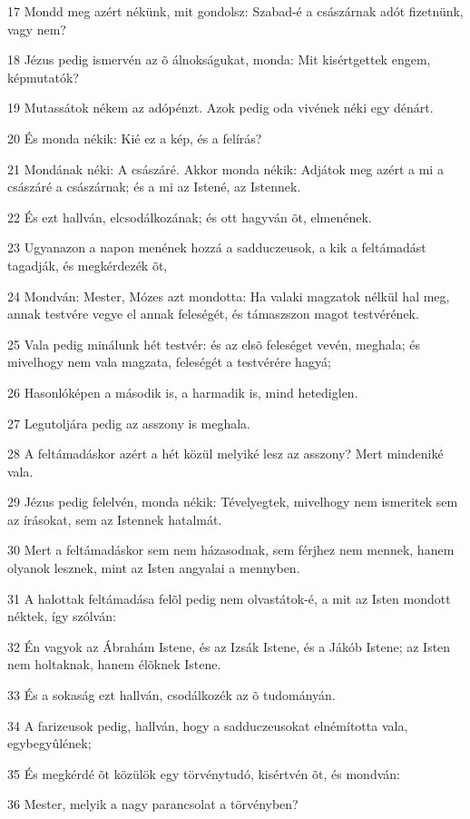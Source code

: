 \par 17 Mondd meg azért nékünk, mit gondolsz: Szabad-é a császárnak adót fizetnünk, vagy nem?
\par 18 Jézus pedig ismervén az õ álnokságukat, monda: Mit kisértgettek engem, képmutatók?
\par 19 Mutassátok nékem az adópénzt. Azok pedig oda vivének néki egy dénárt.
\par 20 És monda nékik: Kié ez a kép, és a felírás?
\par 21 Mondának néki: A császáré. Akkor monda nékik: Adjátok meg azért a mi a császáré a császárnak; és a mi az Istené, az Istennek.
\par 22 És ezt hallván, elcsodálkozának; és ott hagyván õt, elmenének.
\par 23 Ugyanazon a napon menének hozzá a sadduczeusok, a kik a feltámadást tagadják,  és megkérdezék õt,
\par 24 Mondván: Mester, Mózes azt mondotta: Ha valaki magzatok nélkül hal meg, annak testvére vegye el annak feleségét, és támaszszon magot testvérének.
\par 25 Vala pedig minálunk hét testvér: és az elsõ feleséget vevén, meghala; és mivelhogy nem vala magzata, feleségét a testvérére hagyá;
\par 26 Hasonlóképen a második is, a harmadik is, mind hetediglen.
\par 27 Legutoljára pedig az asszony is meghala.
\par 28 A feltámadáskor azért a hét közül melyiké lesz az asszony? Mert mindeniké vala.
\par 29 Jézus pedig felelvén, monda nékik: Tévelyegtek, mivelhogy nem ismeritek sem az írásokat, sem az Istennek hatalmát.
\par 30 Mert a feltámadáskor sem nem házasodnak, sem férjhez nem mennek, hanem olyanok lesznek, mint az Isten angyalai a mennyben.
\par 31 A halottak feltámadása felõl pedig nem olvastátok-é, a mit az Isten mondott néktek, így szólván:
\par 32 Én vagyok az Ábrahám Istene, és az Izsák Istene, és a Jákób Istene; az Isten nem holtaknak, hanem élõknek Istene.
\par 33 És a sokaság ezt hallván, csodálkozék az õ tudományán.
\par 34 A farizeusok pedig, hallván, hogy a sadduczeusokat elnémította vala, egybegyûlének;
\par 35 És megkérdé õt közülök egy törvénytudó, kisértvén õt, és mondván:
\par 36 Mester, melyik a nagy parancsolat a törvényben?
